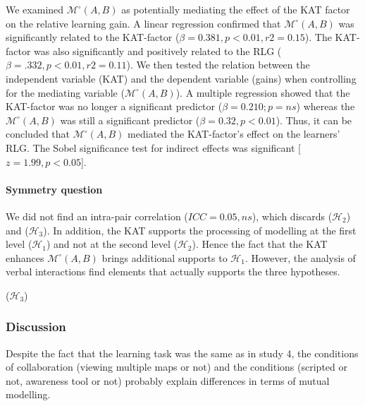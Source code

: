 \documentclass[natbib]{svjour3}
\newcommand{\gmodel}[2]{{$\mathcal{M}(#1, #2)$}}
\newcommand{\gModel}[2]{{$\mathcal{M}^{\circ}(#1, #2)$}}
\begin{document}
We examined \gModel{A}{B} as potentially mediating the effect of the KAT factor
on the relative learning gain. A linear regression confirmed that \gModel{A}{B}
was significantly related to the KAT-factor ($\beta= 0.381, p < 0.01, r2 = 0.15$).
The KAT-factor was also significantly and positively related to the RLG ($\beta=
.332, p < 0.01, r2 = 0.11$). We then tested the relation between the independent
variable (KAT) and the dependent variable (gains) when controlling for the
mediating variable (\gModel{A}{B}). A multiple regression showed that the
KAT-factor was no longer a significant predictor ($\beta= 0.210; p = ns$) whereas
the \gModel{A}{B} was still a significant predictor ($\beta= 0.32, p < 0.01$).
Thus, it can be concluded that \gModel{A}{B} mediated the KAT-factor's effect on
the learners' RLG. The Sobel significance test for indirect effects was
significant [$z = 1.99, p < 0.05$]. 

\paragraph{Symmetry question} We did not find an intra-pair correlation ($ICC =
0.05, ns$), which discards  ($\mathcal{H}_{2}$) and  ($\mathcal{H}_{3}$). In
addition, the KAT supports the processing of modelling at the first level
($\mathcal{H}_{1}$) and not at the second level ($\mathcal{H}_{2}$). Hence the
fact that the KAT enhances  \gModel{A}{B}  brings additional supports to
$\mathcal{H}_{1}$. However, the analysis of verbal interactions find elements
that actually supports the three hypotheses.



 ($\mathcal{H}_{3}$) 


\subsubsection*{Discussion}

Despite the fact that the learning task was the same as in study 4, the
conditions of collaboration (viewing multiple maps or not) and the conditions
(scripted or not, awareness tool or not) probably explain differences in terms
of mutual modelling.
\end{document}
